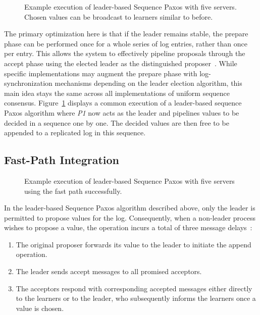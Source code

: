 \begin{figure}[t]
    \centering
    
    \caption{Example execution of leader-based Sequence Paxos with five servers. Chosen values can be broadcast to learners similar to before.}
    \label{fig:leader_based_sequence_paxos}
\end{figure}

The primary optimization here is that if the leader remains stable, the prepare phase can be performed once for a whole series of log entries, rather than once per entry. This allows the system to effectively pipeline proposals through the accept phase using the elected leader as the distinguished proposer~\cite{Lamport-Paxos-2001, Haridi-LeaderBasedSequencePaxos-2020,Ng-OmniPaxos-2023}. While specific implementations may augment the prepare phase with log-synchronization mechanisms depending on the leader election algorithm, this main idea stays the same across all implementations of uniform sequence consensus. Figure~\ref{fig:leader_based_sequence_paxos} displays a common execution of a leader-based sequence Paxos algorithm where \textit{P1} now acts as the leader and pipelines values to be decided in a sequence one by one. The decided values are then free to be appended to a replicated log in this sequence.


\subsection{Fast-Path Integration}

\begin{figure}[t]
    \centering
    
    \caption{Example execution of leader-based Sequence Paxos with five servers using the fast path successfully.}
    \label{fig:leader_based_sequence_paxos_fast_path}
\end{figure}

In the leader-based Sequence Paxos algorithm described above, only the leader is permitted to propose values for the log. Consequently, when a non-leader process wishes to propose a value, the operation incurs a total of three message delays~\cite{Junqueira-ClassicVsFastPaxos-2007}:
\begin{enumerate}
    \item The original proposer forwards its value to the leader to initiate the append operation.
    \item The leader sends accept messages to all promised acceptors.
    \item The acceptors respond with corresponding accepted messages either directly to the learners or to the leader, who subsequently informs the learners once a value is chosen. 
\end{enumerate}

